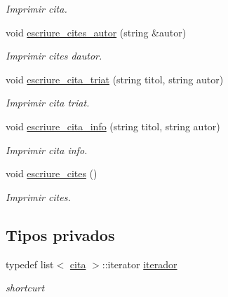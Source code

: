 \begin{DoxyCompactItemize}
\begin{DoxyCompactList}\small\item\em Imprimir cita. \end{DoxyCompactList}\item 
void \hyperlink{class_cites_a12ac50ed7017de796b3ce3b96df7d848}{escriure\+\_\+cites\+\_\+autor} (string \&autor)
\begin{DoxyCompactList}\small\item\em Imprimir cites d\textquotesingle{}autor. \end{DoxyCompactList}\item 
void \hyperlink{class_cites_ac692741811e35c8da2e92906d21cef07}{escriure\+\_\+cita\+\_\+triat} (string titol, string autor)
\begin{DoxyCompactList}\small\item\em Imprimir cita triat. \end{DoxyCompactList}\item 
void \hyperlink{class_cites_adf71af09037fa45f5cfd3095769f75a4}{escriure\+\_\+cita\+\_\+info} (string titol, string autor)
\begin{DoxyCompactList}\small\item\em Imprimir cita info. \end{DoxyCompactList}\item 
void \hyperlink{class_cites_a7cbdd378b53f56bc20dfa2f16e6be49e}{escriure\+\_\+cites} ()
\begin{DoxyCompactList}\small\item\em Imprimir cites. \end{DoxyCompactList}\end{DoxyCompactItemize}
\subsection*{Tipos privados}
\begin{DoxyCompactItemize}
\item 
typedef list$<$ \hyperlink{struct_cites_1_1cita}{cita} $>$\+::iterator \hyperlink{class_cites_ae425e520dfe8c7271cb7465f450e8824}{iterador}
\begin{DoxyCompactList}\small\item\em shortcurt \end{DoxyCompactList}\end{DoxyCompactItemize}
